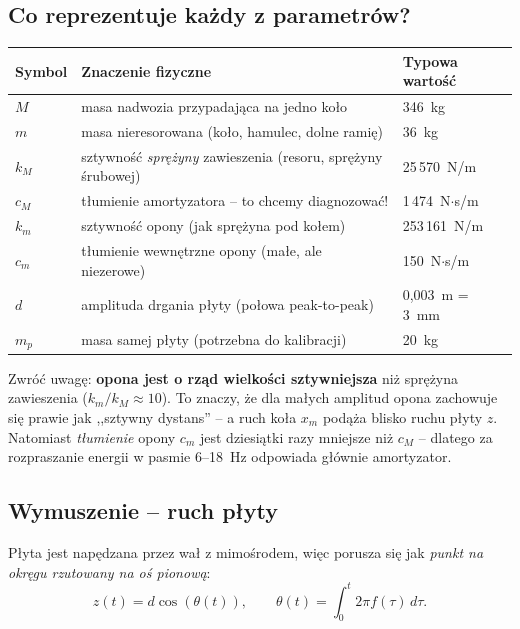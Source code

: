 \documentclass[11pt,a4paper]{article}
\theoremstyle{plainpol}
\begin{document}
\subsection{Co reprezentuje każdy z parametrów?}

\begin{center}
\begin{tabular}{lp{8.5cm}l}
\toprule
\textbf{Symbol} & \textbf{Znaczenie fizyczne} & \textbf{Typowa wartość} \\
\midrule
$M$ & masa nadwozia przypadająca na jedno koło & 346~kg \\
$m$ & masa nieresorowana (koło, hamulec, dolne ramię) & 36~kg \\
$k_M$ & sztywność \emph{sprężyny} zawieszenia (resoru, sprężyny śrubowej) & 25\,570~N/m \\
$c_M$ & tłumienie amortyzatora -- to chcemy diagnozować! & 1\,474~N$\cdot$s/m \\
$k_m$ & sztywność opony (jak sprężyna pod kołem) & 253\,161~N/m \\
$c_m$ & tłumienie wewnętrzne opony (małe, ale niezerowe) & 150~N$\cdot$s/m \\
$d$ & amplituda drgania płyty (połowa peak-to-peak) & 0,003~m = 3~mm \\
$m_p$ & masa samej płyty (potrzebna do kalibracji) & 20~kg \\
\bottomrule
\end{tabular}
\end{center}

\begin{intuicja}
Zwróć uwagę: \textbf{opona jest o rząd wielkości sztywniejsza} niż
sprężyna zawieszenia ($k_m / k_M \approx 10$). To znaczy, że dla małych
amplitud opona zachowuje się prawie jak ,,sztywny dystans'' -- a ruch
koła $x_m$ podąża blisko ruchu płyty $z$. Natomiast \emph{tłumienie}
opony $c_m$ jest dziesiątki razy mniejsze niż $c_M$ -- dlatego za
rozpraszanie energii w pasmie 6--18~Hz odpowiada głównie amortyzator.
\end{intuicja}

\subsection{Wymuszenie -- ruch płyty}

Płyta jest napędzana przez wał z mimośrodem, więc porusza się jak
\emph{punkt na okręgu rzutowany na oś pionową}:
\begin{equation}
  z(t) = d\cos(\theta(t)), \qquad
  \theta(t) = \int_0^t 2\pi f(\tau)\,d\tau.
  \label{eq:z}
\end{equation}
\end{document}
